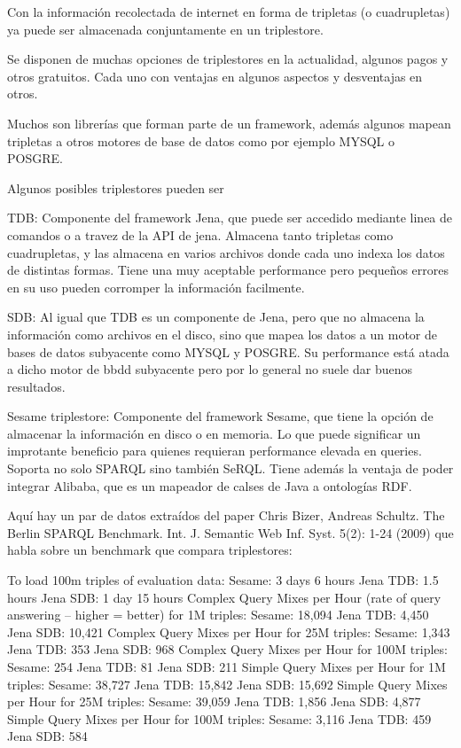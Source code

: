 Con la información recolectada de internet en forma de tripletas (o cuadrupletas) ya puede ser almacenada conjuntamente en un triplestore. 

Se disponen de muchas opciones de triplestores en la actualidad, algunos pagos y otros gratuitos. Cada uno con ventajas en algunos aspectos y desventajas en otros.

Muchos son librerías que forman parte de un framework, además algunos mapean tripletas a otros motores de base de datos como por ejemplo MYSQL o POSGRE.

Algunos posibles triplestores pueden ser

TDB: Componente del framework Jena, que puede ser accedido mediante linea de comandos o a travez de la API de jena. Almacena tanto tripletas como cuadrupletas, y las almacena en varios archivos donde cada uno indexa los datos de distintas formas. Tiene una muy aceptable performance pero pequeños errores en su uso pueden corromper la información facilmente.

SDB: Al igual que TDB es un componente de Jena, pero que no almacena la información como archivos en el disco, sino que mapea los datos a un motor de bases de datos subyacente como MYSQL y POSGRE. Su performance está atada a dicho motor de bbdd subyacente pero por lo general no suele dar buenos resultados. 

Sesame triplestore: Componente del framework Sesame, que tiene la opción de almacenar la información en disco o en memoria. Lo que puede significar un improtante beneficio para quienes requieran performance elevada en queries. Soporta no solo SPARQL sino también SeRQL. Tiene además la ventaja de poder integrar Alibaba, que es un mapeador de calses de Java a ontologías RDF.

Aquí hay un par de datos extraídos del paper Chris Bizer, Andreas Schultz. The Berlin SPARQL Benchmark. Int. J. Semantic Web Inf. Syst. 5(2): 1-24 (2009) que habla sobre un benchmark que compara triplestores:


    To load 100m triples of evaluation data:
        Sesame: 3 days 6 hours
        Jena TDB: 1.5 hours
        Jena SDB: 1 day 15 hours
    Complex Query Mixes per Hour (rate of query answering -- higher = better) for 1M triples:
        Sesame: 18,094
        Jena TDB: 4,450
        Jena SDB: 10,421
    Complex Query Mixes per Hour for 25M triples:
        Sesame: 1,343
        Jena TDB: 353
        Jena SDB: 968
    Complex Query Mixes per Hour for 100M triples:
        Sesame: 254
        Jena TDB: 81
        Jena SDB: 211
    Simple Query Mixes per Hour for 1M triples:
        Sesame: 38,727
        Jena TDB: 15,842
        Jena SDB: 15,692
    Simple Query Mixes per Hour for 25M triples:
        Sesame: 39,059
        Jena TDB: 1,856
        Jena SDB: 4,877
    Simple Query Mixes per Hour for 100M triples:
        Sesame: 3,116
        Jena TDB: 459
        Jena SDB: 584

